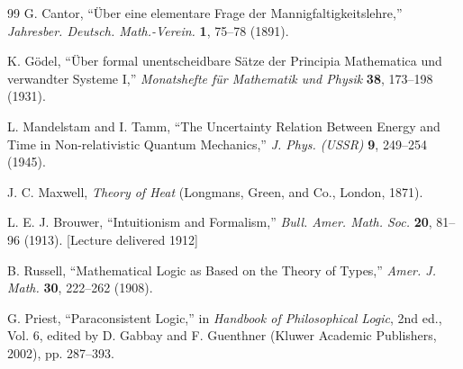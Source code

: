 \documentclass[twocolumn,10pt]{article}
\theoremstyle{definition}
\theoremstyle{remark}
\begin{document}
\begin{thebibliography}{99}
G. Cantor, ``Über eine elementare Frage der Mannigfaltigkeitslehre,'' \textit{Jahresber. Deutsch. Math.-Verein.} \textbf{1}, 75--78 (1891).

K. Gödel, ``Über formal unentscheidbare Sätze der Principia Mathematica und verwandter Systeme I,'' \textit{Monatshefte für Mathematik und Physik} \textbf{38}, 173--198 (1931).

L. Mandelstam and I. Tamm, ``The Uncertainty Relation Between Energy and Time in Non-relativistic Quantum Mechanics,'' \textit{J. Phys. (USSR)} \textbf{9}, 249--254 (1945).

J. C. Maxwell, \textit{Theory of Heat} (Longmans, Green, and Co., London, 1871).

L. E. J. Brouwer, ``Intuitionism and Formalism,'' \textit{Bull. Amer. Math. Soc.} \textbf{20}, 81--96 (1913). [Lecture delivered 1912]

B. Russell, ``Mathematical Logic as Based on the Theory of Types,'' \textit{Amer. J. Math.} \textbf{30}, 222--262 (1908).

G. Priest, ``Paraconsistent Logic,'' in \textit{Handbook of Philosophical Logic}, 2nd ed., Vol. 6, edited by D. Gabbay and F. Guenthner (Kluwer Academic Publishers, 2002), pp. 287--393.

\end{thebibliography}
\end{document}
